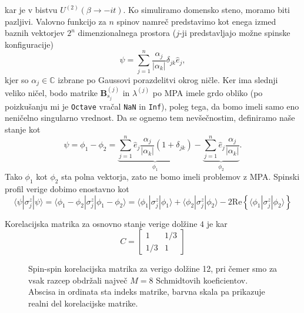 \documentclass[12pt, a4 paper]{article}
\begin{document}
kar je v bistvu $U^{(2)}(\beta \to -it)$. Ko simuliramo domensko steno, moramo biti pazljivi. Valovno funkcijo za $n$
spinov namre\v c predstavimo kot enega izmed baznih vektorjev $2^n$ dimenzionalnega prostora ($j$-ji predstavljajo mo\v zne
spinske konfiguracije)
\[
	\psi = \sum_{j=1}^n\frac{\alpha_j}{|\alpha_k|}\delta_{jk}\hat{e}_j,
\]
kjer so $\alpha_j \in \mathbb{C}$ izbrane po Gaussovi porazdelitvi okrog ni\v cle.
Ker ima slednji veliko ni\v cel, bodo matrike $\mathbf{B}^{(j)}_{s_j}$ in $\lambda^{(j)}$ po MPA imele grdo obliko
(po poizku\v sanju mi je \texttt{Octave} vra\v cal \texttt{NaN} in \texttt{Inf}), poleg tega, da bomo imeli samo eno
neni\v celno singularno vrednost. Da se ognemo tem nev\v se\v cnostim, definiramo na\v se stanje kot
\[
	\psi = \phi_1 - \phi_2 = \underbrace{\sum_{j = 1}^n\hat{e}_j \frac{\alpha_j}{|\alpha_k|}(1 + \delta_{jk})}_{\phi_1}
		- \underbrace{\sum_{j=1}^n\hat{e}_j \frac{\alpha_j}{|\alpha_k|}}_{\phi_2}.
\]
Tako $\phi_1$ kot $\phi_2$ sta polna vektorja, zato ne bomo imeli problemov z MPA. Spinski profil verige dobimo enostavno
kot
\[
	\langle\psi|\sigma^z_j|\psi\rangle = \langle\phi_1 - \phi_2|\sigma^z_j|\phi_1 - \phi_2\rangle =
	\langle\phi_1|\sigma^z_j|\phi_1\rangle + \langle\phi_2|\sigma_j^z|\phi_2\rangle - 2\mathrm{Re}\left\{
	\langle\phi_1|\sigma^z_j|\phi_2\rangle\right\}
\]

Korelacijska matrika za osnovno stanje verige dol\v zine $4$ je kar
\begin{equation}
	C = \begin{bmatrix} 1 & 1/3 \\ 1/3 & 1\end{bmatrix}
\end{equation}

\begin{figure}[H]\centering
	
	\caption{Spin-spin korelacijska matrika za verigo dol\v zine 12, pri \v cemer smo za vsak razcep obdr\v zali
		najve\v c $M = 8$ Schmidtovih koeficientov. Abscisa in ordinata sta indeks matrike, barvna skala
		pa prikazuje realni del korelacijske matrike.}
\end{figure}
\end{document}
